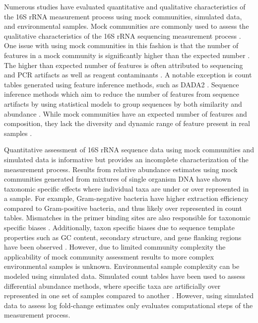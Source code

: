 \documentclass{bmcart}
\begin{document}
Numerous studies have evaluated quantitative and qualitative
characteristics of the 16S rRNA measurement process using mock
communities, simulated data, and environmental samples.
Mock communities are commonly used to assess the qualitative
characteristics of the 16S rRNA sequencing measurement process
\cite{bokulich2016mockrobiota}. One issue with using mock communities
in this fashion is that the number of features in a mock
community is significantly higher than the expected number
\cite{Kopylova2014}. The higher than expected number of features is
often attributed to sequencing and PCR artifacts as well as reagent
contaminants \cite{brooks2015truth, Huse2010}. 
A notable exception is count tables generated using feature inference methods, such as DADA2 \cite{callahan2016dada2}. Sequence inference methods which aim to reduce the number of features from sequence artifacts by using statistical models to group sequences by both similarity and abundance .
While mock communities have an expected number of features and
composition, they lack the diversity and dynamic range of feature
present in real samples \cite{bokulich2016mockrobiota}.

Quantitative assessment of 16S rRNA sequence data using mock communities and
simulated data is informative but provides an
incomplete characterization of the measurement process.
Results from relative abundance estimates using mock communities generated from
mixtures of single organism DNA have shown taxonomic specific effects
where individual taxa are under or over represented in a sample. For
example, Gram-negative bacteria have higher extraction efficiency
compared to Gram-positive bacteria, and thus likely over represented
in count tables\cite{Costea2017, Olson2012}.
Mismatches in the primer binding sites are also responsible for
taxonomic specific biases
\cite{brooks2015truth, klindworth2012evaluation, Gohl2016}.
Additionally, taxon specific biases due to sequence template properties
such as GC content, secondary structure, and gene flanking regions have
been observed \cite{Pinto2012, Hansen1998, Gohl2016}.
However, due to limited community complexity the applicability of
mock community assessment results to more complex environmental samples is unknown. 
Environmental sample complexity can be modeled using simulated data. Simulated count tables have been used to assess differential abundance methods, where specific taxa are
artificially over represented in one set of samples compared to another
\cite{McMurdie2014}. 
However, using simulated data to assess log fold-change
estimates only evaluates computational steps of the measurement process.
\end{document}
